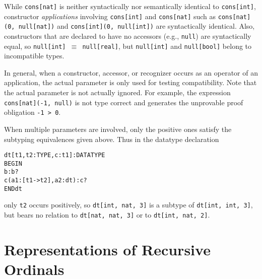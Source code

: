\documentclass[11pt,twoside]{book}
\begin{document}
While \texttt{cons[nat]} is neither syntactically nor semantically identical
to \texttt{cons[int]}, constructor \emph{applications} involving \texttt{cons[int]} and \texttt{cons[nat]} such as \texttt{cons[nat](0, null[nat])} and \texttt{cons[int](0, null[int])} are syntactically identical.  Also, constructors
that are declared to have no accessors (e.g., \texttt{null}) are
syntactically equal, so \texttt{null[int] \(\equiv\) null[real]}, but \texttt{null[int]} and \texttt{null[bool]} belong to incompatible types. 

In general, when a constructor, accessor, or recognizer occurs as an
operator of an application, the actual parameter is only used for testing
compatibility.    Note that the actual parameter is not actually ignored.
For example, the expression \texttt{cons[nat](-1, null)} is not type correct
and generates the unprovable proof obligation \texttt{-1 > 0}\@. 

When multiple parameters are involved, only the positive ones satisfy the
subtyping equivalences given above.  Thus in the datatype declaration
\begin{alltt}
dt[t1, t2: TYPE, c: t1]: DATATYPE
 BEGIN
  b: b?
  c(a1:[t1 -> t2], a2: dt): c?
 END dt
\end{alltt}
only \texttt{t2} occurs positively, so \texttt{dt[int, nat, 3]} is a subtype of
\texttt{dt[int, int, 3]}, but bears no relation to \texttt{dt[nat, nat, 3]} or
to \texttt{dt[int, nat, 2]}.


\chapter{Representations of Recursive Ordinals}\label{section:ordinals}
\end{document}
